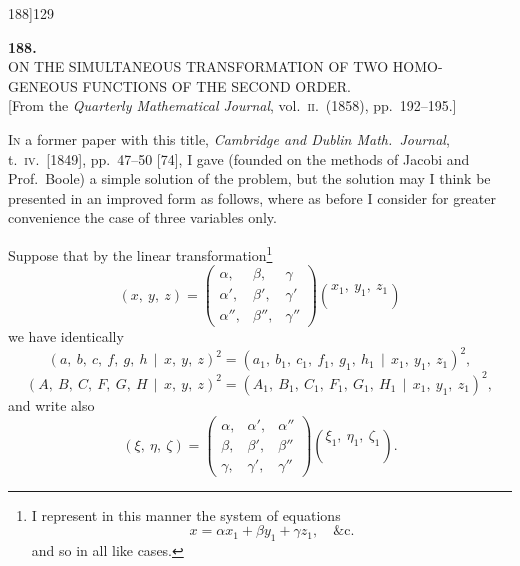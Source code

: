 \documentclass[11pt]{article}
\begin{document}
\begin{center}
\small 188]\hfill\textsc{}\hfill\textsc{129}
\end{center}

\bigskip

\begin{center}
{\Large\bfseries 188.}\\[8pt]
{\large ON THE SIMULTANEOUS TRANSFORMATION OF TWO HOMO-\\
GENEOUS FUNCTIONS OF THE SECOND ORDER.}\\[6pt]
\small [From the \emph{Quarterly Mathematical Journal}, vol.~\textsc{ii}.\ (1858), pp.~192--195.]
\end{center}

\bigskip

\noindent \textsc{In} a former paper with this title, \emph{Cambridge and Dublin Math.\ Journal}, t.~\textsc{iv}.\ [1849], pp.~47--50 [74], I gave (founded on the methods of Jacobi and Prof.\ Boole) a simple solution of the problem, but the solution may I think be presented in an improved form as follows, where as before I consider for greater convenience the case of three variables only.

Suppose that by the linear transformation\footnote{I represent in this manner the system of equations
\[ x = \alpha x_{1} + \beta y_{1} + \gamma z_{1}, \quad \&\text{c.} \]
and so in all like cases.}
\[
(x,\ y,\ z) = \left(\begin{array}{ccc} \alpha, & \beta, & \gamma \\ \alpha', & \beta', & \gamma' \\ \alpha'', & \beta'', & \gamma'' \end{array}\right)\!\!\genfrac{(}{)}{0pt}{}{x_{1},\ y_{1},\ z_{1}}{}
\]
we have identically
\[
(a,\ b,\ c,\ f,\ g,\ h\,\mid\, x,\ y,\ z)^{2} = (a_{1},\ b_{1},\ c_{1},\ f_{1},\ g_{1},\ h_{1}\,\mid\, x_{1},\ y_{1},\ z_{1})^{2},
\]
\[
(A,\ B,\ C,\ F,\ G,\ H\,\mid\, x,\ y,\ z)^{2} = (A_{1},\ B_{1},\ C_{1},\ F_{1},\ G_{1},\ H_{1}\,\mid\, x_{1},\ y_{1},\ z_{1})^{2},
\]
and write also
\[
(\xi,\ \eta,\ \zeta) = \left(\begin{array}{ccc} \alpha, & \alpha', & \alpha'' \\ \beta, & \beta', & \beta'' \\ \gamma, & \gamma', & \gamma'' \end{array}\right)\!\!\genfrac{(}{)}{0pt}{}{\xi_{1},\ \eta_{1},\ \zeta_{1}}{}.
\]
\end{document}
